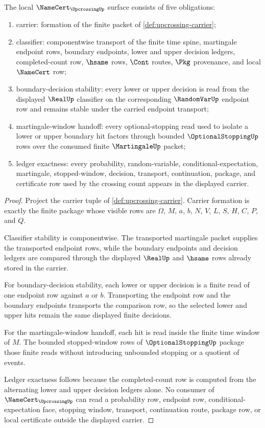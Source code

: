 \begin{theorem}
\label{thm:upcrossing-namecert-obligations}
The local $\NameCert_{\UpcrossingUp}$ surface consists of five obligations:
\begin{enumerate}
\item carrier: formation of the finite packet of \autoref{def:upcrossing-carrier};
\item classifier: componentwise transport of the finite time spine, martingale endpoint rows, boundary endpoints, lower and upper decision ledgers, completed-count row, $\hsame$ rows, $\Cont$ routes, $\Pkg$ provenance, and local $\NameCert$ row;
\item boundary-decision stability: every lower or upper decision is read from the displayed $\RealUp$ classifier on the corresponding $\RandomVarUp$ endpoint row and remains stable under the carried endpoint transport;
\item martingale-window handoff: every optional-stopping read used to isolate a lower or upper boundary hit factors through bounded $\OptionalStoppingUp$ rows over the consumed finite $\MartingaleUp$ packet;
\item ledger exactness: every probability, random-variable, conditional-expectation, martingale, stopped-window, decision, transport, continuation, package, and certificate row used by the crossing count appears in the displayed carrier.
\end{enumerate}
\end{theorem}
\begin{proof}
Project the carrier tuple of \autoref{def:upcrossing-carrier}. Carrier formation is exactly the finite package whose visible rows are $\Omega$, $M$, $a$, $b$, $N$, $V$, $L$, $S$, $H$, $C$, $P$, and $Q$.

Classifier stability is componentwise. The transported martingale packet supplies the transported endpoint rows, while the boundary endpoints and decision ledgers are compared through the displayed $\RealUp$ and $\hsame$ rows already stored in the carrier.

For boundary-decision stability, each lower or upper decision is a finite read of one endpoint row against $a$ or $b$. Transporting the endpoint row and the boundary endpoints transports the comparison row, so the selected lower and upper hits remain the same displayed finite decisions.

For the martingale-window handoff, each hit is read inside the finite time window of $M$. The bounded stopped-window rows of $\OptionalStoppingUp$ package those finite reads without introducing unbounded stopping or a quotient of events.

Ledger exactness follows because the completed-count row is computed from the alternating lower and upper decision ledgers alone. No consumer of $\NameCert_{\UpcrossingUp}$ can read a probability row, endpoint row, conditional-expectation face, stopping window, transport, continuation route, package row, or local certificate outside the displayed carrier.
\end{proof}

